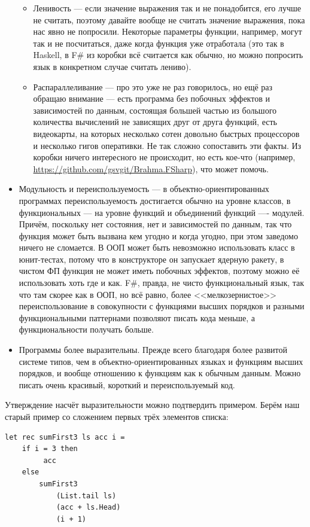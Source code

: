 \documentclass[a5paper]{article}
\begin{document}
\begin{itemize}
	\begin{itemize}
		\item Ленивость --- если значение выражения так и не понадобится, его лучше не считать, поэтому давайте вообще не считать значение выражения, пока нас явно не попросили. Некоторые параметры функции, например, могут так и не посчитаться, даже когда функция уже отработала (это так в Haskell, в F\# из коробки всё считается как обычно, но можно попросить язык в конкретном случае считать лениво).
		\item Распараллеливание --- про это уже не раз говорилось, но ещё раз обращаю внимание --- есть программа без побочных эффектов и зависимостей по данным, состоящая большей частью из большого количества вычислений не зависящих друг от друга функций, есть видеокарты, на которых несколько сотен довольно быстрых процессоров и несколько гигов оперативки. Не так сложно сопоставить эти факты. Из коробки ничего интересного не происходит, но есть кое-что (например, \url{https://github.com/gsvgit/Brahma.FSharp}), что может помочь.
	\end{itemize}
	\item Модульность и переиспользуемость --- в объектно-ориентированных программах переиспользуемость достигается обычно на уровне классов, в функциональных --- на уровне функций и объединений функций ---- модулей. Причём, поскольку нет состояния, нет и зависимостей по данным, так что функция может быть вызвана кем угодно и когда угодно, при этом заведомо ничего не сломается. В ООП может быть невозможно использовать класс в юнит-тестах, потому что в конструкторе он запускает ядерную ракету, в чистом ФП функция не может иметь побочных эффектов, поэтому можно её использовать хоть где и как. F\#, правда, не чисто функциональный язык, так что там скорее как в ООП, но всё равно, более <<мелкозернистое>> переиспользование в совокупности с функциями высших порядков и разными функциональными паттернами позволяют писать кода меньше, а функциональности получать больше.
	\item Программы более выразительны. Прежде всего благодаря более развитой системе типов, чем в объектно-ориентированных языках и функциям высших порядков, и вообще отношению к функциям как к обычным данным. Можно писать очень красивый, короткий и переиспользуемый код.
\end{itemize}

Утверждение насчёт выразительности можно подтвердить примером. Берём наш старый пример со сложением первых трёх элементов списка:
\begin{verbatim}
let rec sumFirst3 ls acc i =
    if i = 3 then 
         acc 
    else 
        sumFirst3 
            (List.tail ls) 
            (acc + ls.Head) 
            (i + 1)
\end{verbatim}
\end{document}
